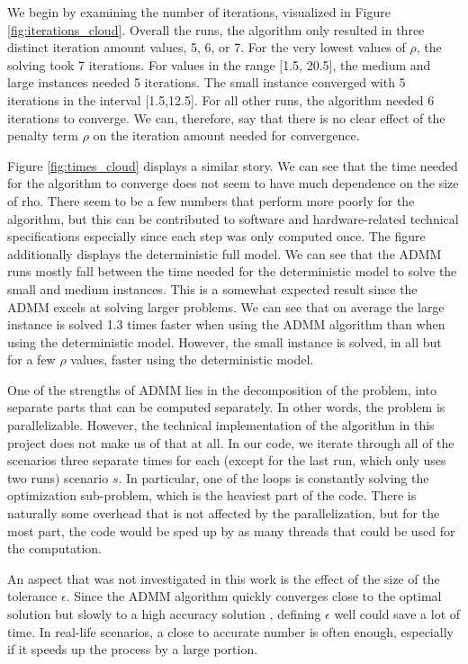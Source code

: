 \documentclass[a4paper]{artikel3}
\begin{document}
We begin by examining the number of iterations, visualized in Figure \ref{fig:iterations_cloud}. Overall the runs, the algorithm only resulted in three distinct iteration amount values, 5, 6, or 7. For the very lowest values of $\rho$, the solving took 7 iterations. For values in the range [1.5, 20.5], the medium and large instances needed 5 iterations. The small instance converged with 5 iterations in the interval [1.5,12.5]. For all other runs, the algorithm needed 6 iterations to converge. We can, therefore, say that there is no clear effect of the penalty term $\rho$ on the iteration amount needed for convergence. 

Figure \ref{fig:times_cloud} displays a similar story. We can see that the time needed for the algorithm to converge does not seem to have much dependence on the size of rho. There seem to be a few numbers that perform more poorly for the algorithm, but this can be contributed to software and hardware-related technical specifications especially since each step was only computed once. The figure additionally displays the deterministic full model. We can see that the ADMM runs mostly fall between the time needed for the deterministic model to solve the small and medium instances. This is a somewhat expected result since the ADMM excels at solving larger problems. We can see that on average the large instance is solved 1.3 times faster when using the ADMM algorithm than when using the deterministic model. However, the small instance is solved, in all but for a few $\rho$ values, faster using the deterministic model.

One of the strengths of ADMM lies in the decomposition of the problem, into separate parts that can be computed separately. In other words, the problem is parallelizable. However, the technical implementation of the algorithm in this project does not make us of that at all. In our code, we iterate through all of the scenarios three separate times for each (except for the last run, which only uses two runs) scenario $s$. In particular, one of the loops is constantly solving the optimization sub-problem, which is the heaviest part of the code. There is naturally some overhead that is not affected by the parallelization, but for the most part, the code would be sped up by as many threads that could be used for the computation.

An aspect that was not investigated in this work is the effect of the size of the tolerance $\epsilon$. Since the ADMM algorithm quickly converges close to the optimal solution but slowly to a high accuracy solution \cite{boyd2011distributed}, defining $\epsilon$ well could save a lot of time. In real-life scenarios, a close to accurate number is often enough, especially if it speeds up the process by a large portion.
\end{document}
